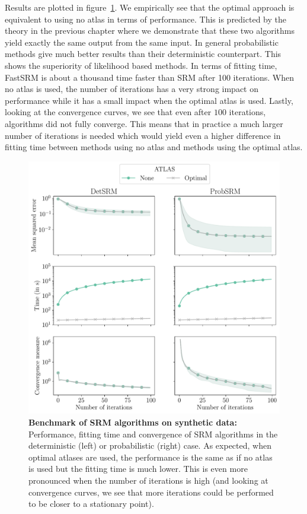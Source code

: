 Results are plotted in figure~\ref{fig:srm:synthetic_gradient}. 
We empirically see that the optimal approach is equivalent to using no atlas in
terms of performance. This is predicted by the theory in the previous chapter
where we demonstrate that these two algorithms yield exactly the same output from the same input.
In general probabilistic methods give much better results than their deterministic
counterpart. This shows the superiority of likelihood based methods.
In terms of fitting time, FastSRM is about a thousand time faster than SRM after
100 iterations. When no atlas is used, the number
of iterations has a very strong impact on performance while it has a small impact
when the optimal atlas is used. 
Lastly, looking at the convergence curves, we see that even after $100$ iterations, algorithms did
not fully converge. This means that in practice a much larger number of
iterations is needed which would yield even a higher difference in fitting time
between methods using no atlas and methods using the optimal atlas.

\begin{figure}
  \centering
  \includegraphics[width=\textwidth]{figures/srm/synthetic_gradient.pdf}
  \caption{\textbf{Benchmark of SRM algorithms on synthetic data: } Performance,
    fitting time and convergence of SRM algorithms in the deterministic (left)
    or probabilistic (right) case.  As expected, when optimal atlases are used,
    the performance is the same as if no atlas is used but the fitting time is
    much lower. This is even more pronounced when the number of iterations is
    high (and looking at convergence curves, we see that more iterations could
    be performed to be closer to a stationary point).}
  \label{fig:srm:synthetic_gradient}
\end{figure}


